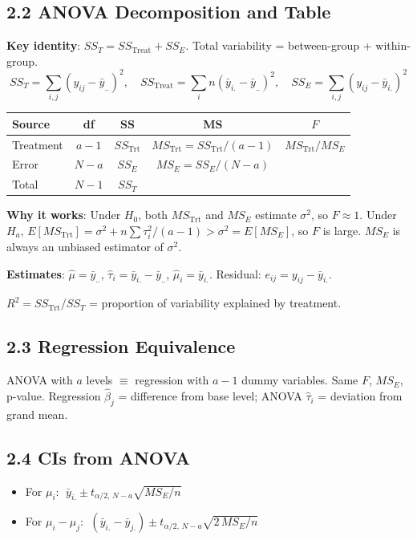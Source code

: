 \documentclass[9pt,letterpaper]{article}
\begin{document}
\subsection{2.2 ANOVA Decomposition and Table}

\textbf{Key identity}: $SS_T = SS_{\text{Treat}} + SS_E$. Total variability = between-group + within-group.
\[
SS_T = \sum_{i,j}(y_{ij}-\bar{y}_{..})^2, \quad SS_{\text{Treat}} = \sum_i n(\bar{y}_{i.}-\bar{y}_{..})^2, \quad SS_E = \sum_{i,j}(y_{ij}-\bar{y}_{i.})^2
\]

\begin{center}\small
\begin{tabular}{@{}lcccc@{}}
\toprule
Source & df & SS & MS & $F$ \\
\midrule
Treatment & $a-1$ & $SS_{\text{Trt}}$ & $MS_{\text{Trt}} = SS_{\text{Trt}}/(a-1)$ & $MS_{\text{Trt}}/MS_E$ \\
Error & $N-a$ & $SS_E$ & $MS_E = SS_E/(N-a)$ & \\
Total & $N-1$ & $SS_T$ & & \\
\bottomrule
\end{tabular}
\end{center}

\textbf{Why it works}: Under $H_0$, both $MS_{\text{Trt}}$ and $MS_E$ estimate $\sigma^2$, so $F \approx 1$. Under $H_a$, $E[MS_{\text{Trt}}] = \sigma^2 + n\sum\tau_i^2/(a-1) > \sigma^2 = E[MS_E]$, so $F$ is large. $MS_E$ is always an unbiased estimator of $\sigma^2$.

\textbf{Estimates}: $\hat\mu=\bar{y}_{..}$, $\hat\tau_i=\bar{y}_{i.}-\bar{y}_{..}$, $\hat\mu_i=\bar{y}_{i.}$. Residual: $e_{ij}=y_{ij}-\bar{y}_{i.}$.

$R^2 = SS_{\text{Trt}}/SS_T$ = proportion of variability explained by treatment.

\subsection{2.3 Regression Equivalence}
ANOVA with $a$ levels $\equiv$ regression with $a-1$ dummy variables. Same $F$, $MS_E$, p-value. Regression $\hat\beta_j$ = difference from base level; ANOVA $\hat\tau_i$ = deviation from grand mean.

\subsection{2.4 CIs from ANOVA}
\begin{itemize}
    \item For $\mu_i$: $\;\bar{y}_{i.} \pm t_{\alpha/2,\,N-a}\sqrt{MS_E/n}$
    \item For $\mu_i - \mu_j$: $\;(\bar{y}_{i.}-\bar{y}_{j.}) \pm t_{\alpha/2,\,N-a}\sqrt{2\,MS_E/n}$
\end{itemize}
\end{document}
